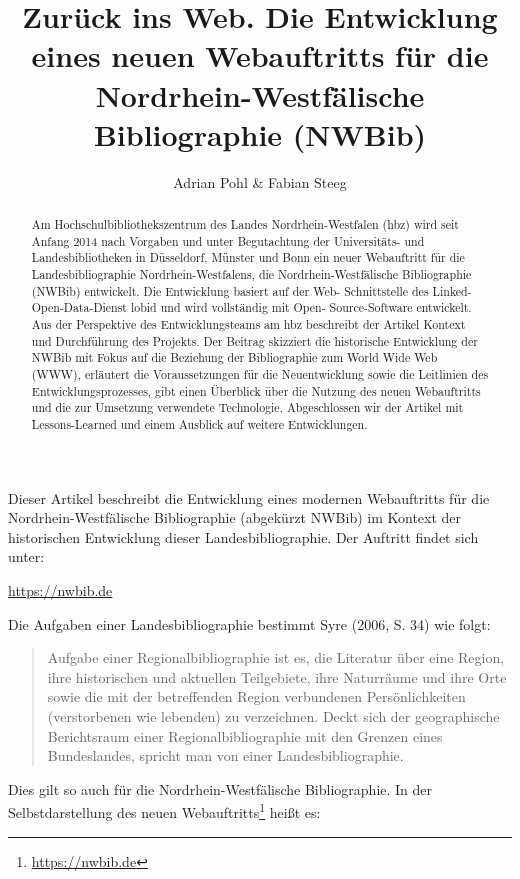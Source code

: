 \documentclass[a4paper,
fontsize=11pt,
oneside,
numbers=noperiodatend,
parskip=half-,
bibliography=totoc,
final
]{scrartcl}
\title{\LARGE{Zurück ins Web. Die Entwicklung eines neuen Webauftritts für die Nord\-rhein-West\-fälische Bibliographie (NWBib)}} %
\author{Adrian Pohl \& Fabian Steeg} %
\date{}
\begin{document}
\maketitle
\thispagestyle{fancyplain} 

\begin{abstract}
\small
Am Hochschulbibliothekszentrum des Landes Nord\-rhein-West\-falen (hbz) wird
seit Anfang 2014 nach Vorgaben und unter Begutachtung der Uni\-ver\-si\-täts-
und Landesbibliotheken in Düsseldorf, Münster und Bonn ein neuer
Webauftritt für die Landesbibliographie Nord\-rhein-West\-falens, die
Nord\-rhein-West\-fälische Bibliographie (NWBib) entwickelt. Die Entwicklung
basiert auf der Web- Schnittstelle des Linked-Open-Data-Dienst lobid und
wird vollständig mit Open- Source-Software entwickelt. Aus der
Perspektive des Entwicklungsteams am hbz beschreibt der Artikel Kontext
und Durchführung des Projekts. Der Beitrag skizziert die historische
Entwicklung der NWBib mit Fokus auf die Beziehung der Bibliographie zum
World Wide Web (WWW), erläutert die Voraussetzungen für die
Neuentwicklung sowie die Leitlinien des Entwicklungsprozesses, gibt
einen Überblick über die Nutzung des neuen Webauftritts und die zur
Umsetzung verwendete Technologie. Abgeschlossen wir der Artikel mit
Lessons-Learned und einem Ausblick auf weitere Entwicklungen.
\end{abstract}

Dieser Artikel beschreibt die Entwicklung eines modernen Webauftritts
für die Nord\-rhein-West\-fälische Bibliographie (abgekürzt NWBib) im
Kontext der historischen Entwicklung dieser Landesbibliographie. Der
Auftritt findet sich unter:

\begin{center}
\url{https://nwbib.de}
\end{center}

Die Aufgaben einer Landesbibliographie bestimmt Syre (2006, S. 34) wie
folgt:

\begin{quote}
Aufgabe einer Regionalbibliographie ist es, die Literatur über eine
Region, ihre historischen und aktuellen Teilgebiete, ihre Naturräume und
ihre Orte sowie die mit der betreffenden Region verbundenen
Persönlichkeiten (verstorbenen wie lebenden) zu verzeichnen. Deckt sich
der geographische Berichtsraum einer Regionalbibliographie mit den
Grenzen eines Bundeslandes, spricht man von einer Landesbibliographie.
\end{quote}

Dies gilt so auch für die Nord\-rhein-West\-fälische Bibliographie. In der
Selbstdarstellung des neuen Webauftritts\footnote{\url{https://nwbib.de}}
heißt es:
\end{document}
